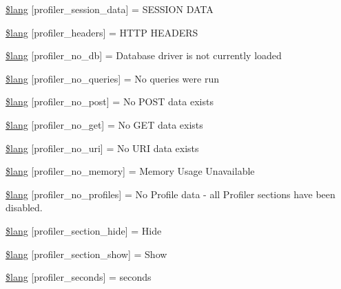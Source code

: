 \begin{DoxyCompactItemize}
\item 
\mbox{\hyperlink{profiler__lang_8php_a75e50cd81f9049c979e3d27d32e4d30a}{\$lang}} \mbox{[}\textquotesingle{}profiler\+\_\+session\+\_\+data\textquotesingle{}\mbox{]} = \textquotesingle{}S\+E\+S\+S\+I\+ON D\+A\+TA\textquotesingle{}
\item 
\mbox{\hyperlink{profiler__lang_8php_ac0fc73cbb5ca9822333fda5adde092e0}{\$lang}} \mbox{[}\textquotesingle{}profiler\+\_\+headers\textquotesingle{}\mbox{]} = \textquotesingle{}H\+T\+TP H\+E\+A\+D\+E\+RS\textquotesingle{}
\item 
\mbox{\hyperlink{profiler__lang_8php_ae2c683baf06544290071fc1f875ba434}{\$lang}} \mbox{[}\textquotesingle{}profiler\+\_\+no\+\_\+db\textquotesingle{}\mbox{]} = \textquotesingle{}Database driver is not currently loaded\textquotesingle{}
\item 
\mbox{\hyperlink{profiler__lang_8php_a37bca6d1ba6d71e435408efec9752a27}{\$lang}} \mbox{[}\textquotesingle{}profiler\+\_\+no\+\_\+queries\textquotesingle{}\mbox{]} = \textquotesingle{}No queries were run\textquotesingle{}
\item 
\mbox{\hyperlink{profiler__lang_8php_a1214a1b3e1f77a8526c504bf5cd3342f}{\$lang}} \mbox{[}\textquotesingle{}profiler\+\_\+no\+\_\+post\textquotesingle{}\mbox{]} = \textquotesingle{}No P\+O\+ST data exists\textquotesingle{}
\item 
\mbox{\hyperlink{profiler__lang_8php_a40def9fbdbb2da118999453440df496f}{\$lang}} \mbox{[}\textquotesingle{}profiler\+\_\+no\+\_\+get\textquotesingle{}\mbox{]} = \textquotesingle{}No G\+ET data exists\textquotesingle{}
\item 
\mbox{\hyperlink{profiler__lang_8php_a8768b2e35912324d82232d0755680e51}{\$lang}} \mbox{[}\textquotesingle{}profiler\+\_\+no\+\_\+uri\textquotesingle{}\mbox{]} = \textquotesingle{}No U\+RI data exists\textquotesingle{}
\item 
\mbox{\hyperlink{profiler__lang_8php_a581928901340bb21ebe17aa379f6bad9}{\$lang}} \mbox{[}\textquotesingle{}profiler\+\_\+no\+\_\+memory\textquotesingle{}\mbox{]} = \textquotesingle{}Memory Usage Unavailable\textquotesingle{}
\item 
\mbox{\hyperlink{profiler__lang_8php_ab25c3da98f122cea8cb1ea55bc079cf1}{\$lang}} \mbox{[}\textquotesingle{}profiler\+\_\+no\+\_\+profiles\textquotesingle{}\mbox{]} = \textquotesingle{}No Profile data -\/ all Profiler sections have been disabled.\textquotesingle{}
\item 
\mbox{\hyperlink{profiler__lang_8php_ae5d6115438d89bcee0eb0f9bb00907ae}{\$lang}} \mbox{[}\textquotesingle{}profiler\+\_\+section\+\_\+hide\textquotesingle{}\mbox{]} = \textquotesingle{}Hide\textquotesingle{}
\item 
\mbox{\hyperlink{profiler__lang_8php_a5874df6015d4fe672d5514b9d1abbd1d}{\$lang}} \mbox{[}\textquotesingle{}profiler\+\_\+section\+\_\+show\textquotesingle{}\mbox{]} = \textquotesingle{}Show\textquotesingle{}
\item 
\mbox{\hyperlink{profiler__lang_8php_af3fde3c90349310ae9e26bf63fb06b78}{\$lang}} \mbox{[}\textquotesingle{}profiler\+\_\+seconds\textquotesingle{}\mbox{]} = \textquotesingle{}seconds\textquotesingle{}
\end{DoxyCompactItemize}


